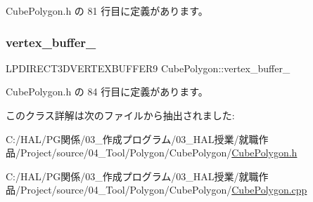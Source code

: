  Cube\+Polygon.\+h の 81 行目に定義があります。

\mbox{\label{class_cube_polygon_adbb5b6de2c10bfaba0d91569ac81e589}} 
\subsubsection{\texorpdfstring{vertex\+\_\+buffer\+\_\+}{vertex\_buffer\_}}
{\footnotesize\ttfamily L\+P\+D\+I\+R\+E\+C\+T3\+D\+V\+E\+R\+T\+E\+X\+B\+U\+F\+F\+E\+R9 Cube\+Polygon\+::vertex\+\_\+buffer\+\_\+\hspace{0.3cm}{\ttfamily [private]}}



 Cube\+Polygon.\+h の 84 行目に定義があります。



このクラス詳解は次のファイルから抽出されました\+:\begin{DoxyCompactItemize}
\item 
C\+:/\+H\+A\+L/\+P\+G関係/03\+\_\+作成プログラム/03\+\_\+\+H\+A\+L授業/就職作品/\+Project/source/04\+\_\+\+Tool/\+Polygon/\+Cube\+Polygon/\mbox{\hyperlink{_cube_polygon_8h}{Cube\+Polygon.\+h}}\item 
C\+:/\+H\+A\+L/\+P\+G関係/03\+\_\+作成プログラム/03\+\_\+\+H\+A\+L授業/就職作品/\+Project/source/04\+\_\+\+Tool/\+Polygon/\+Cube\+Polygon/\mbox{\hyperlink{_cube_polygon_8cpp}{Cube\+Polygon.\+cpp}}\end{DoxyCompactItemize}
